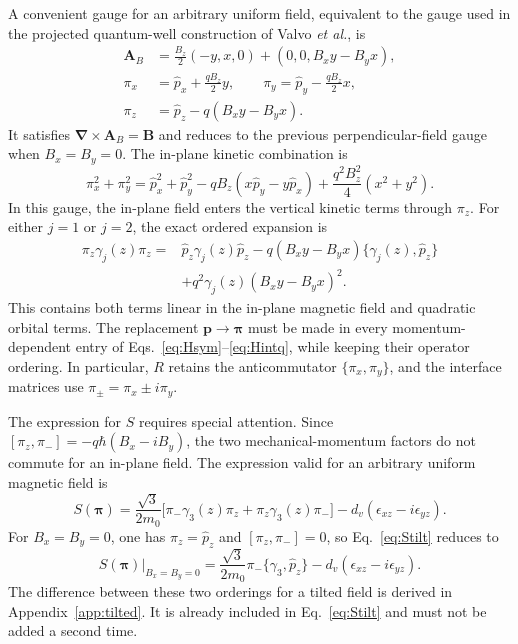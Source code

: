 \documentclass[10pt,letterpaper]{article}
\newcommand{\ep}{\epsilon}
\begin{document}
A convenient gauge for an arbitrary uniform field, equivalent to the gauge used in the projected quantum-well construction of Valvo \emph{et al.}, is
\begin{equation}
\begin{aligned}
\bm A_B&=\frac{B_z}{2}(-y,x,0)+(0,0,B_xy-B_yx),\\
\pi_x&= \hat{p}_ x+\frac{qB_z}{2}y,\qquad
\pi_y= \hat{p}_ y-\frac{qB_z}{2}x,\\
\pi_z&= \hat{p}_ z-q(B_xy-B_yx).
\end{aligned}
\label{eq:gauge}
\end{equation}
It satisfies $\bm\nabla\times\bm A_B=\bm B$ and reduces to the previous perpendicular-field gauge when $B_x=B_y=0$. The in-plane kinetic combination is
\begin{equation}
\pi_x^2+\pi_y^2
= \hat{p}_ x^2+ \hat{p}_ y^2-qB_z(x \hat{p}_ y-y \hat{p}_ x)
+\frac{q^2B_z^2}{4}(x^2+y^2).
\label{eq:orbitalexpansion}
\end{equation}
In this gauge, the in-plane field enters the vertical kinetic terms through $\pi_z$. For either $j=1$ or $j=2$, the exact ordered expansion is
\begin{equation}
\begin{aligned}
\pi_z\gamma_j(z)\pi_z
={}& \hat{p}_ z\gamma_j(z) \hat{p}_ z
-q(B_xy-B_yx)\{\gamma_j(z), \hat{p}_ z\}\\
&+q^2\gamma_j(z)(B_xy-B_yx)^2.
\end{aligned}
\label{eq:tiltedkinetic}
\end{equation}
This contains both terms linear in the in-plane magnetic field and quadratic orbital terms. The replacement $\bm p\to\bm\pi$ must be made in every momentum-dependent entry of Eqs.~\eqref{eq:Hsym}--\eqref{eq:Hintq}, while keeping their operator ordering. In particular, $R$ retains the anticommutator $\{\pi_x,\pi_y\}$, and the interface matrices use $\pi_\pm=\pi_x\pm i\pi_y$.

The expression for $S$ requires special attention. Since $[\pi_z,\pi_-]=-q\hbar(B_x-iB_y)$, the two mechanical-momentum factors do not commute for an in-plane field. The expression valid for an arbitrary uniform magnetic field is
\begin{equation}
S(\bm\pi)=\frac{\sqrt3}{2m_0}
\bigl[\pi_-\gamma_3(z)\pi_z+\pi_z\gamma_3(z)\pi_-\bigr]
-d_v(\ep_ {xz}-i\ep_ {yz}).
\label{eq:Stilt}
\end{equation}
For $B_x=B_y=0$, one has $\pi_z= \hat{p}_ z$ and $[\pi_z,\pi_-]=0$, so Eq.~\eqref{eq:Stilt} reduces to
\begin{equation}
S(\bm\pi)\big|_{B_x=B_y=0}
=\frac{\sqrt3}{2m_0}\pi_-\{\gamma_3, \hat{p}_ z\}
-d_v(\ep_ {xz}-i\ep_ {yz}).
\label{eq:SBz}
\end{equation}
The difference between these two orderings for a tilted field is derived in Appendix~\ref{app:tilted}. It is already included in Eq.~\eqref{eq:Stilt} and must not be added a second time.
\end{document}
